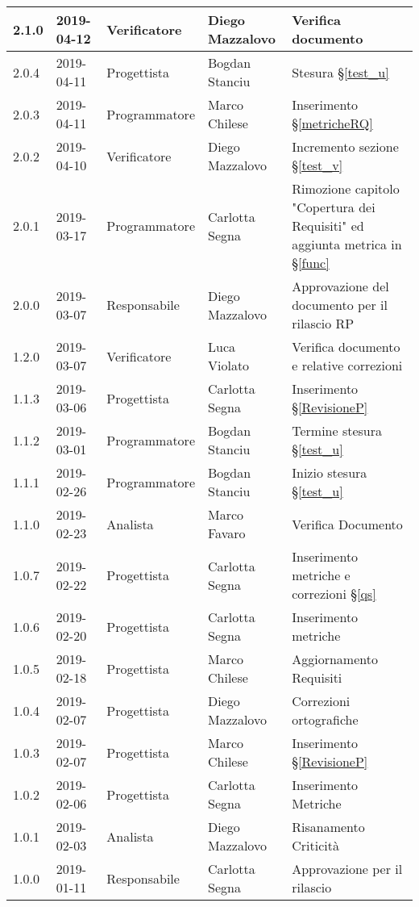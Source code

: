 \begin{center}
\begin{longtable}[c]{|m{}|m{}|m{}|m{}|p{}|}
\hline
2.1.0 & 2019-04-12 & Verificatore & Diego Mazzalovo & Verifica documento\\
\hline
\rowcolor{grigio}2.0.4 & 2019-04-11 & Progettista & Bogdan Stanciu & Stesura §\ref{test_u} \\
\hline
2.0.3 & 2019-04-11 & Programmatore & Marco Chilese & Inserimento §\ref{metricheRQ}\\
\hline
\rowcolor{grigio}2.0.2 & 2019-04-10 & Verificatore & Diego Mazzalovo & Incremento sezione §\ref{test_v}\\
\hline
2.0.1 & 2019-03-17 & Programmatore & Carlotta Segna & Rimozione capitolo "Copertura dei Requisiti" ed aggiunta metrica in  §\ref{func}\\
\hline
\rowcolor{grigio}2.0.0 & 2019-03-07 & Responsabile & Diego Mazzalovo & Approvazione del documento per il rilascio RP\\
\hline
1.2.0 & 2019-03-07 & Verificatore & Luca Violato & Verifica documento e relative correzioni\\ 
\hline
\rowcolor{grigio}1.1.3 & 2019-03-06 & Progettista & Carlotta Segna & Inserimento §\ref{RevisioneP} \\
\hline
1.1.2 & 2019-03-01 & Programmatore & Bogdan Stanciu & Termine stesura §\ref{test_u} \\
\hline
\rowcolor{grigio}1.1.1 & 2019-02-26 & Programmatore & Bogdan Stanciu & Inizio stesura §\ref{test_u} \\
\hline
1.1.0 & 2019-02-23 & Analista & Marco Favaro & Verifica Documento\\
\hline
\rowcolor{grigio} 1.0.7 & 2019-02-22 & Progettista & Carlotta Segna & Inserimento metriche e correzioni §\ref{qs}\\
\hline
1.0.6 & 2019-02-20 & Progettista & Carlotta Segna & Inserimento metriche\\
\hline
\rowcolor{grigio} 1.0.5 & 2019-02-18 & Progettista & Marco Chilese & Aggiornamento  Requisiti\\
\hline
1.0.4 & 2019-02-07 & Progettista & Diego Mazzalovo & Correzioni ortografiche \\
\hline
\rowcolor{grigio} 1.0.3 & 2019-02-07 & Progettista & Marco Chilese & Inserimento §\ref{RevisioneP} \\
\hline
1.0.2 & 2019-02-06 & Progettista & Carlotta Segna & Inserimento Metriche \\
\hline
\rowcolor{grigio}1.0.1 & 2019-02-03 & Analista & Diego Mazzalovo & Risanamento Criticità \\
\hline 
1.0.0 & 2019-01-11 & Responsabile & Carlotta Segna & Approvazione per il rilascio\\

\end{longtable}
\end{center}
